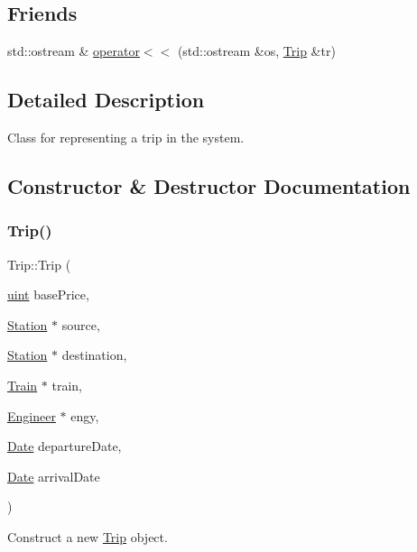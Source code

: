 \subsection*{Friends}
\begin{DoxyCompactItemize}
\item 
std\+::ostream \& \mbox{\hyperlink{classTrip_ad143ba29c1778aa25a53301503c3f2bd}{operator$<$$<$}} (std\+::ostream \&os, \mbox{\hyperlink{classTrip}{Trip}} \&tr)
\end{DoxyCompactItemize}


\subsection{Detailed Description}
Class for representing a trip in the system. 

\subsection{Constructor \& Destructor Documentation}
\mbox{\label{classTrip_ab25669acad521c66612a118ae64d71f5}} 
\subsubsection{\texorpdfstring{Trip()}{Trip()}}
{\footnotesize\ttfamily Trip\+::\+Trip (\begin{DoxyParamCaption}\item[{\mbox{\hyperlink{project__utils_8h_a91ad9478d81a7aaf2593e8d9c3d06a14}{uint}}}]{base\+Price,  }\item[{\mbox{\hyperlink{classStation}{Station}} $\ast$}]{source,  }\item[{\mbox{\hyperlink{classStation}{Station}} $\ast$}]{destination,  }\item[{\mbox{\hyperlink{classTrain}{Train}} $\ast$}]{train,  }\item[{\mbox{\hyperlink{classEngineer}{Engineer}} $\ast$}]{engy,  }\item[{\mbox{\hyperlink{classDate}{Date}}}]{departure\+Date,  }\item[{\mbox{\hyperlink{classDate}{Date}}}]{arrival\+Date }\end{DoxyParamCaption})}



Construct a new \mbox{\hyperlink{classTrip}{Trip}} object. 


